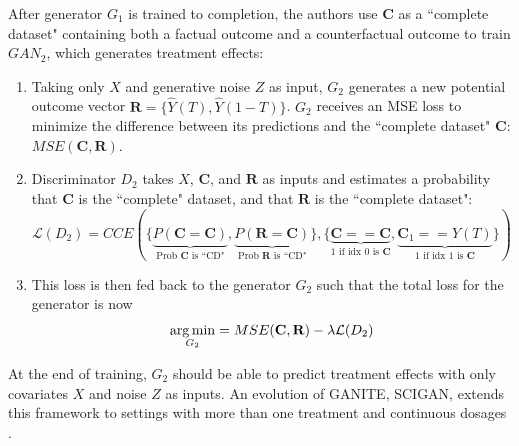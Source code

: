 After generator $G_1$ is trained to completion, the authors use $\textbf{C}$ as a ``complete dataset" containing both a factual outcome and a counterfactual outcome to train $GAN_2$, which generates treatment effects: 
\begin{enumerate}
\singlespacing
    \item Taking only $X$ and generative noise $Z$ as input, $G_2$ generates a new potential outcome vector $\textbf{R}=\{\hat{Y}(T),\hat{Y}(1-T)\}$. $G_2$ receives an MSE loss to minimize the difference between its predictions and the ``complete dataset" $\textbf{C}$: $MSE(\textbf{C},\textbf{R})$.
    \item Discriminator $D_2$ takes $X$, $\textbf{C}$, and $\textbf{R}$ as inputs and estimates a probability that $\textbf{C}$ is the ``complete" dataset, and that $\textbf{R}$ is the ``complete dataset":
    \begin{equation}
    \mathcal{L}(D_2)=CCE(\{\underbrace{P(\textbf{C}=\textbf{C})}_{\text{ Prob $\textbf{C}$ is ``CD" }},\underbrace{P(\textbf{R}=\textbf{C})}_{\text{Prob $\textbf{R}$ is ``CD"}}\},\{\underbrace{\textbf{C}==\textbf{C}}_{\text{1 if idx 0 is $\textbf{C}$}},\underbrace{\textbf{C}_1==Y(T)}_{\text{1 if idx 1 is $\textbf{C}$}}\})
\end{equation}
    \item This loss is then fed back to the generator $G_2$ such that the total loss for the generator is now  
    \begin{equation}
        \operatorname*{arg\,min}_{G_2}=MSE(\textbf{C},\textbf{R}) - \lambda \mathcal{L}(D_2)
    \end{equation}
\end{enumerate}
At the end of training, $G_2$ should be able to predict treatment effects with only covariates $X$ and noise $Z$ as inputs. An evolution of GANITE, SCIGAN, extends this framework to settings with more than one treatment and continuous dosages \citep{bica_sicgan}. 

